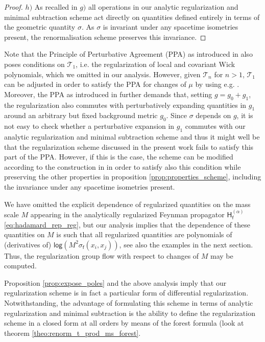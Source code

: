 \documentclass[11pt]{book}
\renewcommand{\log}{\mathsf{log}}
\newcommand{\Tcal}{\mathcal{T}}
\newcommand{\Hsf}{\mathsf{H}}
\newcommand{\fsf}{\mathsf{f}}
\theoremstyle{break}
\begin{document}
{{\begin{proof}
$h)$ As recalled in $g)$ all operations in our analytic regularization and minimal subtraction scheme act directly on quantities defined entirely in terms of the geometric quantity $\sigma$. As $\sigma$ is invariant under any spacetime isometries present, the renormalisation scheme preserves this invariance.





\end{proof}
}



Note that the Principle of Perturbative Agreement (PPA) as introduced in %
also poses conditions on $\Tcal_1$, i.e. the regularization of local and covariant Wick polynomials, which we omitted in our analysis. However, given $\Tcal_n$ for $n>1$, $\Tcal_1$ can be adjusted in order to satisfy the PPA for changes of $\mu$ by using e.g. %
. Moreover, the PPA as introduced in %
further demands that, setting $g = g_0 + g_1$, the regularization also commutes with perturbatively expanding quantities in $g_1$ around an arbitrary but fixed background metric $g_0$. Since $\sigma$ depends on $g$, it is not easy to check whether a perturbative expansion in $g_1$ commutes with our analytic regularization and minimal subtraction scheme and thus it might well be that the regularization scheme discussed in the present work fails to satisfy this part of the PPA. However, if this is the case, 
the scheme can be modified according to the construction in \cite{hollands_conservation_2005}
in order to satisfy also this condition while preserving the other properties in proposition \ref{prop:properties_scheme}, including the invariance under any spacetime isometries present.


\bigskip


We have omitted the explicit dependence of regularized quantities on the mass scale $M$ appearing in the analytically regularized Feynman propagator $\Hsf^{(\alpha)}_\fsf$ \eqref{eq:hadamard_rep_reg}, but our analysis implies that the dependence of these quantities on $M$ is such that all regularized quantities are polynomials of (derivatives of) $\log\left( M^2 \sigma_\fsf(x_i,x_j)\right)$, see also the examples in the next section. Thus, the regularization group flow with respect to changes of $M$ may be computed.

\bigskip

Proposition \ref{prop:expose_poles} and the above analysis imply that our regularization scheme is in fact a particular form of differential regularization. Notwithstanding, the advantage of formulating this scheme in terms of analytic regularization and minimal subtraction is the ability to define the regularization scheme in a closed form at all orders by means of the forest formula (look at theorem \ref{theo:renorm_t_prod_ms_forest}.
}
\end{document}
